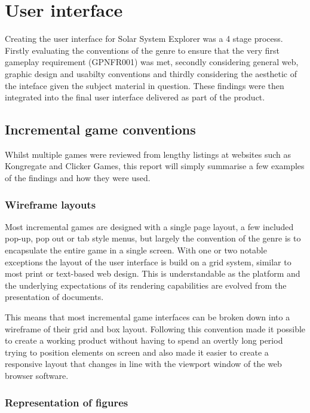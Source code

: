 \documentclass[twoside]{bhamthesis}
\begin{document}
\section{User interface}

Creating the user interface for Solar System Explorer was a 4 stage process. Firstly evaluating the conventions of the genre to ensure that the very first gameplay requirement (GPNFR001) was met, secondly considering general web, graphic design and usabilty conventions and thirdly considering the aesthetic of the inteface given the subject material in question. These findings were then integrated into the final user interface delivered as part of the product.

\subsection{Incremental game conventions}

Whilst multiple games were reviewed from lengthy listings at websites such as Kongregate and Clicker Games, this report will simply summarise a few examples of the findings and how they were used.

\subsubsection{Wireframe layouts}

Most incremental games are designed with a single page layout, a few included pop-up, pop out or tab style menus, but largely the convention of the genre is to encapsulate the entire game in a single screen. With one or two notable exceptions the layout of the user interface is build on a grid system, similar to most print or text-based web design. This is understandable as the platform and the underlying expectations of its rendering capabilities are evolved from the presentation of documents.

This means that most incremental game interfaces can be broken down into a wireframe of their grid and box layout. Following this convention made it possible to create a working product without having to spend an overtly long period trying to position elements on screen and also made it easier to create a responsive layout that changes in line with the viewport window of the web browser software.

\subsubsection{Representation of figures}
\end{document}
